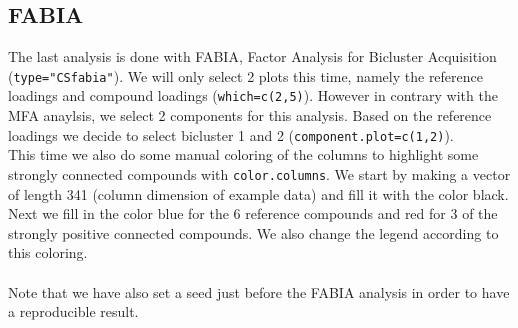 \documentclass[a4paper]{article}\usepackage[]{graphicx}\usepackage[]{color}
\begin{document}
\subsection{FABIA}
The last analysis is done with FABIA, Factor Analysis for Bicluster Acquisition
(\texttt{type="CSfabia"}). We will only select 2 plots this time, namely the
reference loadings and compound loadings (\texttt{which=c(2,5)}). However in
contrary with the MFA anaylsis, we select 2 components for this analysis.
Based on the reference loadings we decide to select bicluster 1 and 2
(\texttt{component.plot=c(1,2)}). \\
This time we also do some manual coloring of the columns to highlight some
strongly connected compounds with \texttt{color.columns}. We start by making a vector of length
341 (column dimension of example data) and fill it with the color black. Next we fill in the
color blue for the 6 reference compounds and red for 3 of the strongly positive
connected compounds. We also change the legend according to this coloring.\\ \\
Note that we have also set a seed just before the FABIA analysis in order to
have a reproducible result.
\end{document}

